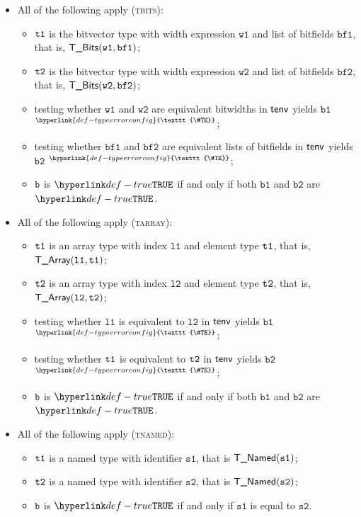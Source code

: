 \documentclass{book}
\newcommand\TypeErrorConfig[0]{\hyperlink{def-typeerrorconfig}{\texttt{\#TE}}}
\newcommand\ProseOrTypeError[0]{\hyperlink{def-proseortypeerror}{$^{\TypeErrorConfig}$}}
\newcommand\vsone[0]{\texttt{s1}}
\newcommand\vstwo[0]{\texttt{s2}}
\newcommand\vwone[0]{\texttt{w1}}
\newcommand\vwtwo[0]{\texttt{w2}}
\newcommand\bfone[0]{\texttt{bf1}}
\newcommand\bftwo[0]{\texttt{bf2}}
\newcommand\vbone[0]{\texttt{b1}}
\newcommand\vbtwo[0]{\texttt{b2}}
\newcommand\vlone[0]{\texttt{l1}}
\newcommand\vltwo[0]{\texttt{l2}}
\begin{document}
\begin{itemize}
  \item All of the following apply (\textsc{tbits}):
  \begin{itemize}
    \item $\texttt{t1}$ is the bitvector type with width expression $\vwone$ and list of bitfields $\bfone$, that is, $\TBits(\vwone, \bfone)$;
    \item $\texttt{t2}$ is the bitvector type with width expression $\vwtwo$ and list of bitfields $\bftwo$, that is, $\TBits(\vwtwo, \bftwo)$;
    \item testing whether $\vwone$ and $\vwtwo$ are equivalent bitwidths in $\textsf{tenv}$ yields $\vbone$ \ProseOrTypeError;
    \item testing whether $\bfone$ and $\bftwo$ are equivalent lists of bitfields in $\textsf{tenv}$ yields $\vbtwo$ \ProseOrTypeError;
    \item $\texttt{b}$ is $\True$ if and only if both $\vbone$ and $\vbtwo$ are $\True$.
  \end{itemize}

  \item All of the following apply (\textsc{tarray}):
  \begin{itemize}
    \item $\texttt{t1}$ is an array type with index $\vlone$ and element type $\texttt{t1}$, that is, $\TArray(\vlone, \vtone)$;
    \item $\texttt{t2}$ is an array type with index $\vltwo$ and element type $\texttt{t2}$, that is, $\TArray(\vltwo, \vttwo)$;
    \item testing whether $\vlone$ is equivalent to $\vltwo$ in $\textsf{tenv}$ yields $\vbone$ \ProseOrTypeError;
    \item testing whether $\texttt{t1}$ is equivalent to $\texttt{t2}$ in $\textsf{tenv}$ yields $\vbtwo$ \ProseOrTypeError;
    \item $\texttt{b}$ is $\True$ if and only if both $\vbone$ and $\vbtwo$ are $\True$.
  \end{itemize}

  \item All of the following apply (\textsc{tnamed}):
  \begin{itemize}
    \item $\texttt{t1}$ is a named type with identifier $\vsone$, that is $\TNamed(\vsone)$;
    \item $\texttt{t2}$ is a named type with identifier $\vstwo$, that is $\TNamed(\vstwo)$;
    \item $\texttt{b}$ is $\True$ if and only if $\vsone$ is equal to $\vstwo$.
  \end{itemize}


\end{itemize}
\end{document}
